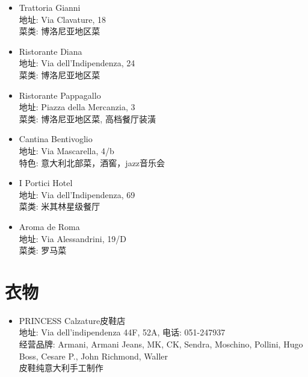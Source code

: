 \begin{itemize}
\item Trattoria Gianni\\
地址: Via Clavature, 18\\
菜类: 博洛尼亚地区菜

\item Ristorante Diana\\
地址: Via dell'Indipendenza, 24\\
菜类: 博洛尼亚地区菜

\item Ristorante Pappagallo\\
地址: Piazza della Mercanzia, 3\\
菜类: 博洛尼亚地区菜, 高档餐厅装潢

\item Cantina Bentivoglio\\
地址: Via Mascarella, 4/b\\
特色: 意大利北部菜，酒窖，jazz音乐会

\item I Portici Hotel\\
地址: Via dell'Indipendenza, 69\\
菜类: 米其林星级餐厅

\item Aroma de Roma\\
地址: Via Alessandrini, 19/D\\
菜类: 罗马菜
\end{itemize}


\section{衣物}
\begin{itemize}
\item PRINCESS Calzature皮鞋店\\
地址: Via dell'indipendenza 44F, 52A, 电话: 051-247937\\
经营品牌: Armani, Armani Jeans, MK, CK, Sendra, Moschino, Pollini, Hugo Boss, Cesare P., John Richmond, Waller\\
皮鞋纯意大利手工制作
\end{itemize}

